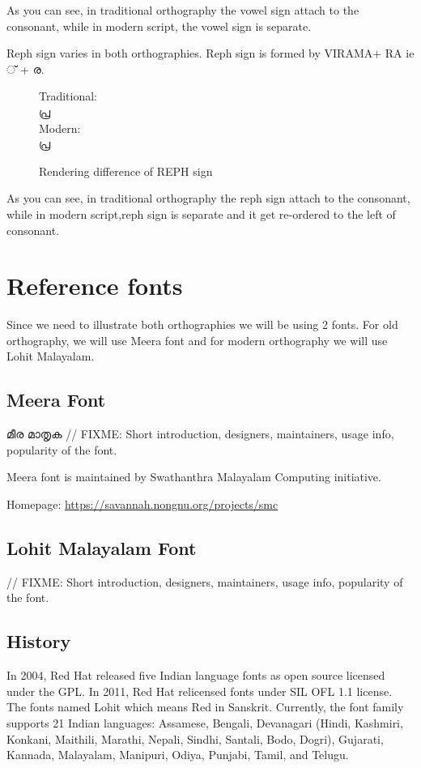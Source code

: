 As you can see, in traditional orthography the vowel sign attach to the
consonant, while in modern script, the vowel sign is separate.

Reph sign varies in both orthographies. Reph sign is formed by VIRAMA+ RA ie
{\malayalam ് + ര}.
\begin{figure}[h]
Traditional:\\ {\meera\textexample  പ്ര }\\
Modern: \\ {\lohitmalayalam\textexample  പ്ര }
   \caption{Rendering difference of REPH sign}
\end{figure}

As you can see, in traditional orthography the reph sign attach to the
consonant, while in modern script,reph sign is separate and it get re-ordered
to the left of consonant.


\section{Reference fonts}

Since we need to illustrate both orthographies we will be using 2
fonts. For old orthography, we will use Meera font and for modern
orthography we will use Lohit Malayalam.

\subsection {Meera Font}
{\meera മീര മാതൃക }
// FIXME: Short introduction, designers, maintainers, usage info, popularity of
the font.

Meera font is maintained by Swathanthra Malayalam Computing initiative.

Homepage: {\url{https://savannah.nongnu.org/projects/smc}}

\subsection {Lohit Malayalam Font}
// FIXME: Short introduction, designers, maintainers, usage info, popularity of
the font.

\subsection {History}
In 2004, Red Hat released five Indian language fonts as open source licensed
under the GPL. In 2011, Red Hat relicensed fonts under SIL OFL 1.1 license.
The fonts named Lohit which means Red in Sanskrit. Currently, the font family
supports 21 Indian languages: Assamese, Bengali, Devanagari (Hindi, Kashmiri,
Konkani, Maithili, Marathi, Nepali, Sindhi, Santali, Bodo, Dogri), Gujarati,
Kannada, Malayalam, Manipuri, Odiya, Punjabi, Tamil, and Telugu.

